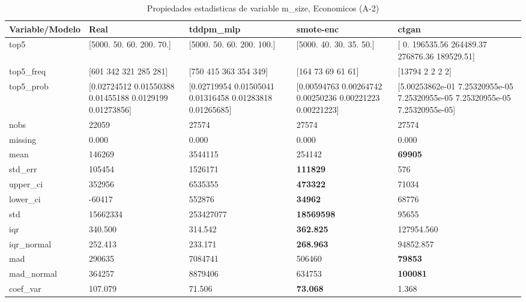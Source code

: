 \begin{table}[H]
\centering
\fontsize{8}{14}\selectfont
\caption{Propiedades  estadisticas de variable m\_size, Economicos (A-2)}
\label{table-stats-economicos-a-2-m_size}
\begin{tabular}{|l|m{10em}|m{10em}|m{10em}|m{10em}|}
\hline
 \rowcolor[gray]{0.8}
Variable/Modelo & Real & tddpm\_mlp & smote-enc & ctgan \\
\hline top5 & [5000.   50.   60.  200.   70.] & [5000.   50.   60.  200.  100.] & [5000.   40.   30.   35.   50.] & [     0.   196535.56 264489.37 276876.36 189529.51] \\
\hline top5\_freq & [601 342 321 285 281] & [750 415 363 354 349] & [164  73  69  61  61] & [13794     2     2     2     2] \\
\hline top5\_prob & [0.02724512 0.01550388 0.01455188 0.0129199  0.01273856] & [0.02719954 0.01505041 0.01316458 0.01283818 0.01265685] & [0.00594763 0.00264742 0.00250236 0.00221223 0.00221223] & [5.00253862e-01 7.25320955e-05 7.25320955e-05 7.25320955e-05
 7.25320955e-05] \\
\hline nobs & 22059 & 27574 & 27574 & 27574 \\
\hline missing & 0.000 & 0.000 & 0.000 & 0.000 \\
\hline mean & 146269 & \cellcolor[rgb]{0.9, 0.54, 0.52} 3544115 & 254142 & \bfseries 69905 \\
\hline std\_err & 105454 & \cellcolor[rgb]{0.9, 0.54, 0.52} 1526171 & \bfseries 111829 & 576 \\
\hline upper\_ci & 352956 & \cellcolor[rgb]{0.9, 0.54, 0.52} 6535355 & \bfseries 473322 & 71034 \\
\hline lower\_ci & -60417 & \cellcolor[rgb]{0.9, 0.54, 0.52} 552876 & \bfseries 34962 & 68776 \\
\hline std & 15662334 & \cellcolor[rgb]{0.9, 0.54, 0.52} 253427077 & \bfseries 18569598 & 95655 \\
\hline iqr & 340.500 & 314.542 & \bfseries 362.825 & \cellcolor[rgb]{0.9, 0.54, 0.52} 127954.560 \\
\hline iqr\_normal & 252.413 & 233.171 & \bfseries 268.963 & \cellcolor[rgb]{0.9, 0.54, 0.52} 94852.857 \\
\hline mad & 290635 & \cellcolor[rgb]{0.9, 0.54, 0.52} 7084741 & 506460 & \bfseries 79853 \\
\hline mad\_normal & 364257 & \cellcolor[rgb]{0.9, 0.54, 0.52} 8879406 & 634753 & \bfseries 100081 \\
\hline coef\_var & 107.079 & 71.506 & \bfseries 73.068 & \cellcolor[rgb]{0.9, 0.54, 0.52} 1.368 \\

\end{tabular}
\end{table}
